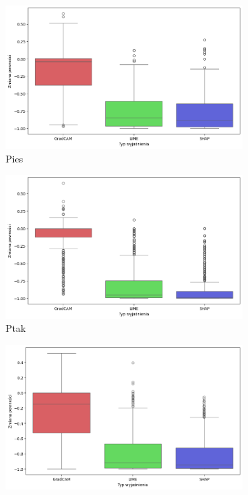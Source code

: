 \begin{figure}[h]
	\centering
	\begin{subfigure}[b]{0.3\textwidth}
		\includegraphics[width=.9\textwidth]{img/base_confidence_exp_dog}
		\caption{Pies}  \label{rys:base_confidence_exp_dog}
	\end{subfigure}
	\begin{subfigure}[b]{0.3\textwidth}
		\centering\includegraphics[width=.9\textwidth]{img/base_confidence_exp_bird}
		\caption{Ptak}  \label{rys:base_confidence_exp_bird}
	\end{subfigure}
	\begin{subfigure}[b]{0.3\textwidth}
		\centering\includegraphics[width=.9\textwidth]{img/base_confidence_exp_vehicle}

\end{subfigure}
\end{figure}
